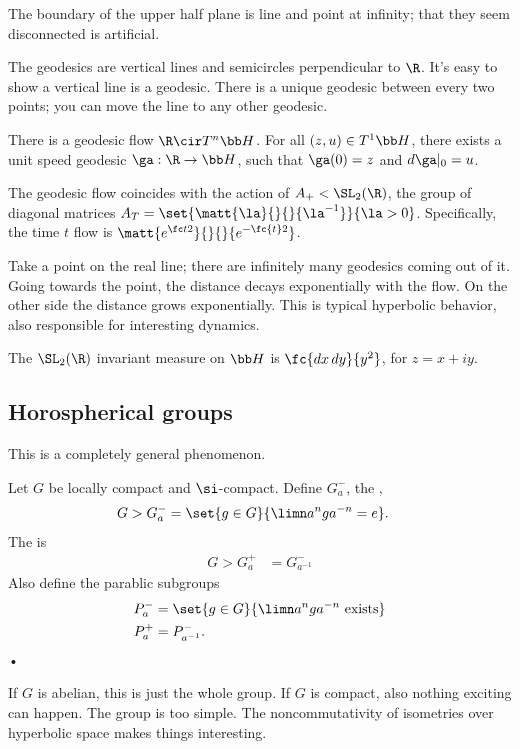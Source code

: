 The boundary of the upper half plane is line and point at infinity; that they seem disconnected is artificial.

The geodesics are vertical lines and semicircles perpendicular to $\R$. It's easy to show a vertical line is a geodesic. There is a unique geodesic between every two points; you can move the line to any other geodesic.

There is a geodesic flow $\R\cir T^n\bb H$. For all $(z,u)\in T^1\bb H$, there exists a unit speed geodesic $\ga:\R\to \bb H$, such that $\ga(0)=z$ and $d\ga|_0=u$. %

\begin{pr}
The geodesic flow coincides with the action of $A_+<\SL_2(\R)$, the group of diagonal matrices $A_T=\set{\matt{\la}{}{}{\la^{-1}}}{\la >0}$. Specifically, the time $t$ flow is $\matt{e^{\fc t2}}{}{}{e^{-\fc{t}2}}$. 
\end{pr}
Take a point on the real line; there are infinitely many geodesics coming out of it.
Going towards the point, the distance decays exponentially with the flow.
On the other side the distance grows exponentially. This is typical hyperbolic behavior, also responsible for interesting dynamics.

The $\SL_2(\R)$ invariant measure on $\bb H$ is $\fc{dx\,dy}{y^2}$, for $z=x+iy$. 
\subsection{Horospherical groups}

This is a completely general phenomenon. 
\begin{df}
Let $G$ be locally compact and $\si$-compact. 
Define $G_a^-$, the ,
\begin{align}
G>G_a^- & = \set{g\in G}{\limn a^n g a^{-n}=e}.
\end{align}
The  is
\begin{align}
G>G_a^+& = G_{a^{-1}}^-
\end{align}
Also define the parablic subgroups
\begin{align}
P_a^- &= \set{g\in G}{\limn a^n ga^{-n}\text{ exists}}\\
P_a^+ &= P_{a^{-1}}^-.
\end{align}•
\end{df} 
If $G$ is abelian, this is just the whole group. If $G$ is compact, also nothing exciting can happen. The group is too simple. %
The noncommutativity of isometries over hyperbolic space makes things interesting.

